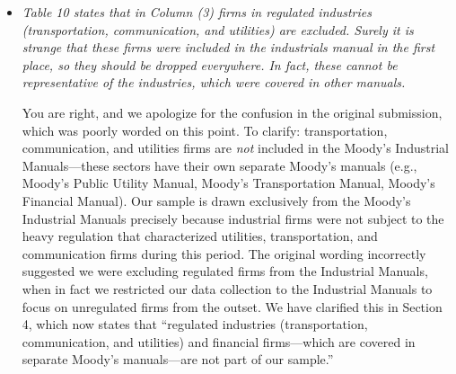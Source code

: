 \begin{itemize}
    \item[\textit{\textcolor{red!60!black}{j.}}] \textit{\textcolor{red!60!black}{
    Table 10 states that in Column (3) firms in regulated industries (transportation, communication, and utilities) are excluded. Surely it is strange that these firms were included in the industrials manual in the first place, so they should be dropped everywhere. In fact, these cannot be representative of the industries, which were covered in other manuals.
    }}

    \bigskip

    \noindent You are right, and we apologize for the confusion in the original submission, which was poorly worded on this point. To clarify: transportation, communication, and utilities firms are \textit{not} included in the Moody's Industrial Manuals---these sectors have their own separate Moody's manuals (e.g., Moody's Public Utility Manual, Moody's Transportation Manual, Moody's Financial Manual). Our sample is drawn exclusively from the Moody's Industrial Manuals precisely because industrial firms were not subject to the heavy regulation that characterized utilities, transportation, and communication firms during this period. The original wording incorrectly suggested we were excluding regulated firms from the Industrial Manuals, when in fact we restricted our data collection to the Industrial Manuals to focus on unregulated firms from the outset. We have clarified this in Section 4, which now states that ``regulated industries (transportation, communication, and utilities) and financial firms---which are covered in separate Moody's manuals---are not part of our sample.'' 

\end{itemize}
